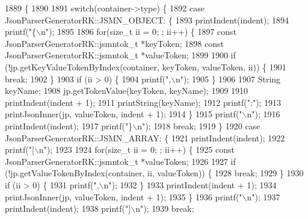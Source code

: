 \begin{DoxyCode}
1889                                                                                                     \{
1890 
1891     \textcolor{keywordflow}{switch}(container->type) \{
1892     \textcolor{keywordflow}{case} JsonParserGeneratorRK::JSMN_OBJECT: \{
1893         printIndent(indent);
1894         printf(\textcolor{stringliteral}{"\{\(\backslash\)n"});
1895 
1896         \textcolor{keywordflow}{for}(\textcolor{keywordtype}{size\_t} ii = 0; ; ii++) \{
1897             \textcolor{keyword}{const} JsonParserGeneratorRK::jsmntok_t *keyToken;
1898             \textcolor{keyword}{const} JsonParserGeneratorRK::jsmntok_t *valueToken;
1899 
1900             \textcolor{keywordflow}{if} (!jp.getKeyValueTokenByIndex(container, keyToken, valueToken, ii)) \{
1901                 \textcolor{keywordflow}{break};
1902             \}
1903             \textcolor{keywordflow}{if} (ii > 0) \{
1904                 printf(\textcolor{stringliteral}{",\(\backslash\)n"});
1905             \}
1906 
1907             String keyName;
1908             jp.getTokenValue(keyToken, keyName);
1909 
1910             printIndent(indent + 1);
1911             printString(keyName);
1912             printf(\textcolor{stringliteral}{":"});
1913             printJsonInner(jp, valueToken, indent + 1);
1914         \}
1915         printf(\textcolor{stringliteral}{"\(\backslash\)n"});
1916         printIndent(indent);
1917         printf(\textcolor{stringliteral}{"\}\(\backslash\)n"});
1918         \textcolor{keywordflow}{break};
1919     \}
1920     \textcolor{keywordflow}{case} JsonParserGeneratorRK::JSMN_ARRAY: \{
1921         printIndent(indent);
1922         printf(\textcolor{stringliteral}{"[\(\backslash\)n"});
1923 
1924         \textcolor{keywordflow}{for}(\textcolor{keywordtype}{size\_t} ii = 0; ; ii++) \{
1925             \textcolor{keyword}{const} JsonParserGeneratorRK::jsmntok_t *valueToken;
1926 
1927             \textcolor{keywordflow}{if} (!jp.getValueTokenByIndex(container, ii, valueToken)) \{
1928                 \textcolor{keywordflow}{break};
1929             \}
1930             \textcolor{keywordflow}{if} (ii > 0) \{
1931                 printf(\textcolor{stringliteral}{",\(\backslash\)n"});
1932             \}
1933             printIndent(indent + 1);
1934             printJsonInner(jp, valueToken, indent + 1);
1935         \}
1936         printf(\textcolor{stringliteral}{"\(\backslash\)n"});
1937         printIndent(indent);
1938         printf(\textcolor{stringliteral}{"]\(\backslash\)n"});
1939         \textcolor{keywordflow}{break};

\end{DoxyCode}
